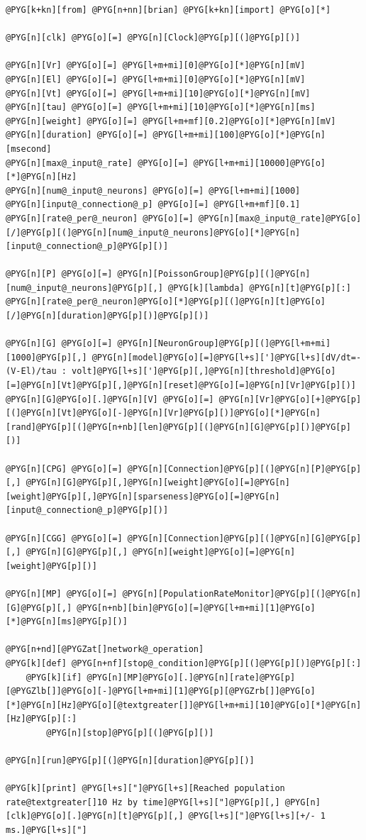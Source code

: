 \documentclass[letterpaper,10pt,english]{manual}
\begin{document}
\begin{Verbatim}[commandchars=@\[\]]
@PYG[k+kn][from] @PYG[n+nn][brian] @PYG[k+kn][import] @PYG[o][*]

@PYG[n][clk] @PYG[o][=] @PYG[n][Clock]@PYG[p][(]@PYG[p][)]

@PYG[n][Vr] @PYG[o][=] @PYG[l+m+mi][0]@PYG[o][*]@PYG[n][mV]
@PYG[n][El] @PYG[o][=] @PYG[l+m+mi][0]@PYG[o][*]@PYG[n][mV]
@PYG[n][Vt] @PYG[o][=] @PYG[l+m+mi][10]@PYG[o][*]@PYG[n][mV]
@PYG[n][tau] @PYG[o][=] @PYG[l+m+mi][10]@PYG[o][*]@PYG[n][ms]
@PYG[n][weight] @PYG[o][=] @PYG[l+m+mf][0.2]@PYG[o][*]@PYG[n][mV]
@PYG[n][duration] @PYG[o][=] @PYG[l+m+mi][100]@PYG[o][*]@PYG[n][msecond]
@PYG[n][max@_input@_rate] @PYG[o][=] @PYG[l+m+mi][10000]@PYG[o][*]@PYG[n][Hz]
@PYG[n][num@_input@_neurons] @PYG[o][=] @PYG[l+m+mi][1000]
@PYG[n][input@_connection@_p] @PYG[o][=] @PYG[l+m+mf][0.1]
@PYG[n][rate@_per@_neuron] @PYG[o][=] @PYG[n][max@_input@_rate]@PYG[o][/]@PYG[p][(]@PYG[n][num@_input@_neurons]@PYG[o][*]@PYG[n][input@_connection@_p]@PYG[p][)]

@PYG[n][P] @PYG[o][=] @PYG[n][PoissonGroup]@PYG[p][(]@PYG[n][num@_input@_neurons]@PYG[p][,] @PYG[k][lambda] @PYG[n][t]@PYG[p][:] @PYG[n][rate@_per@_neuron]@PYG[o][*]@PYG[p][(]@PYG[n][t]@PYG[o][/]@PYG[n][duration]@PYG[p][)]@PYG[p][)]

@PYG[n][G] @PYG[o][=] @PYG[n][NeuronGroup]@PYG[p][(]@PYG[l+m+mi][1000]@PYG[p][,] @PYG[n][model]@PYG[o][=]@PYG[l+s][']@PYG[l+s][dV/dt=-(V-El)/tau : volt]@PYG[l+s][']@PYG[p][,]@PYG[n][threshold]@PYG[o][=]@PYG[n][Vt]@PYG[p][,]@PYG[n][reset]@PYG[o][=]@PYG[n][Vr]@PYG[p][)]
@PYG[n][G]@PYG[o][.]@PYG[n][V] @PYG[o][=] @PYG[n][Vr]@PYG[o][+]@PYG[p][(]@PYG[n][Vt]@PYG[o][-]@PYG[n][Vr]@PYG[p][)]@PYG[o][*]@PYG[n][rand]@PYG[p][(]@PYG[n+nb][len]@PYG[p][(]@PYG[n][G]@PYG[p][)]@PYG[p][)]

@PYG[n][CPG] @PYG[o][=] @PYG[n][Connection]@PYG[p][(]@PYG[n][P]@PYG[p][,] @PYG[n][G]@PYG[p][,]@PYG[n][weight]@PYG[o][=]@PYG[n][weight]@PYG[p][,]@PYG[n][sparseness]@PYG[o][=]@PYG[n][input@_connection@_p]@PYG[p][)]

@PYG[n][CGG] @PYG[o][=] @PYG[n][Connection]@PYG[p][(]@PYG[n][G]@PYG[p][,] @PYG[n][G]@PYG[p][,] @PYG[n][weight]@PYG[o][=]@PYG[n][weight]@PYG[p][)]

@PYG[n][MP] @PYG[o][=] @PYG[n][PopulationRateMonitor]@PYG[p][(]@PYG[n][G]@PYG[p][,] @PYG[n+nb][bin]@PYG[o][=]@PYG[l+m+mi][1]@PYG[o][*]@PYG[n][ms]@PYG[p][)]

@PYG[n+nd][@PYGZat[]network@_operation]
@PYG[k][def] @PYG[n+nf][stop@_condition]@PYG[p][(]@PYG[p][)]@PYG[p][:]
    @PYG[k][if] @PYG[n][MP]@PYG[o][.]@PYG[n][rate]@PYG[p][@PYGZlb[]]@PYG[o][-]@PYG[l+m+mi][1]@PYG[p][@PYGZrb[]]@PYG[o][*]@PYG[n][Hz]@PYG[o][@textgreater[]]@PYG[l+m+mi][10]@PYG[o][*]@PYG[n][Hz]@PYG[p][:]
        @PYG[n][stop]@PYG[p][(]@PYG[p][)]

@PYG[n][run]@PYG[p][(]@PYG[n][duration]@PYG[p][)]

@PYG[k][print] @PYG[l+s]["]@PYG[l+s][Reached population rate@textgreater[]10 Hz by time]@PYG[l+s]["]@PYG[p][,] @PYG[n][clk]@PYG[o][.]@PYG[n][t]@PYG[p][,] @PYG[l+s]["]@PYG[l+s][+/- 1 ms.]@PYG[l+s]["]
\end{Verbatim}
\end{document}
